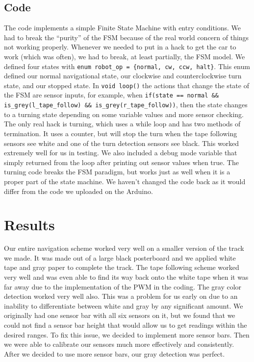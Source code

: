 \documentclass[12pt]{article}
\begin{document}
\subsection*{Code}
The code implements a simple Finite State Machine with entry conditions. We had
to break the ``purity'' of the FSM because of the real world concern of things
not working properly. Whenever we needed to put in a hack to get the car to work
(which was often), we had to break, at least partially, the FSM model. We defined
four states with \verb|enum robot_op = {normal, cw, ccw, halt}|. This enum
defined our normal navigational state, our clockwise and counterclockwise turn
state, and our stopped state. In \verb|void loop()| the actions that change the
state of the FSM are sensor inputs, for example, when \verb|if(state == normal && is_grey(l_tape_follow) && is_grey(r_tape_follow))|, then the state changes to a
turning state depending on some variable values and more sensor checking. The
only real hack is turning, which uses a while loop and has two methods of
termination. It uses a counter, but will stop the turn when the tape following
sensors see white and one of the turn detection sensors see black. This worked
extremely well for us in testing. We also included a debug mode variable that
simply returned from the loop after printing out sensor values when true. The
turning code breaks the FSM paradigm, but works just as well when it is a proper
part of the state machine. We haven't changed the code back as it would differ from the code we uploaded on the Arduino.

\section{Results}
Our entire navigation scheme worked very well on a smaller version of the track we made. It was made out of a large black posterboard and we applied white tape and gray paper to complete the track. The tape following scheme worked very well and was even able to find its way back onto the white tape when it was far away due to the implementation of the PWM in the coding. The gray color detection worked very well also. This was a problem for us early on due to an inability to differentiate between white and gray by any significant amount. We originally had one sensor bar with all six sensors on it, but we found that we could not find a sensor bar height that would allow us to get readings within the desired ranges. To fix this issue, we decided to implement more sensor bars. Then we were able to calibrate our sensors much more effectively and consistently. After we decided to use more sensor bars, our gray detection was perfect.
\end{document}
